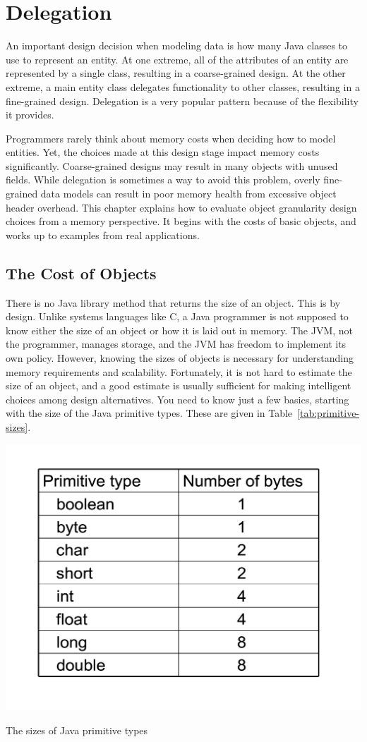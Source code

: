 \chapter{Delegation}

An important design decision when modeling data is how many Java classes to use to represent an entity. At one extreme, all of the attributes of an entity are represented by a single class, resulting in a coarse-grained design. At the other extreme, a main entity class delegates functionality to other classes, resulting in a fine-grained design.  Delegation is a very popular pattern because of the flexibility it provides. 

Programmers rarely think about memory costs when deciding how to model entities. Yet, the choices made at this design stage impact memory costs significantly. Coarse-grained designs may result in many objects with unused fields. While delegation is sometimes a way to avoid this problem, overly fine-grained data models can result in poor memory health from excessive object header overhead. This chapter explains how to evaluate object granularity design choices from a memory perspective. It begins with the costs of basic objects, and works up to examples from real applications.
  
\section{The Cost of Objects}
\label{sec:CostOfObjects}

There is no Java library method that returns the size of an object. This is by design. Unlike systems languages like C, a Java programmer is not supposed to know either the size of an object or how it is laid out in memory. The JVM, not the programmer, manages storage, and the JVM has freedom to implement its own policy. However, knowing the sizes of objects is necessary for understanding memory requirements and scalability. Fortunately, it is not hard to estimate the size of an object, and a good estimate is usually sufficient for making intelligent choices among design alternatives. You need to know just a few basics, starting with the size of the Java primitive types. These are given in Table~\ref{tab:primitive-sizes}.
\begin{table}
  \centering
 \includegraphics[width=.50\textwidth]{Figures/chapter4/primitive-byte-sizes.pdf}
  \caption{The sizes of Java primitive types}
  \label{tab:primitive-sizes}
\end{table}

